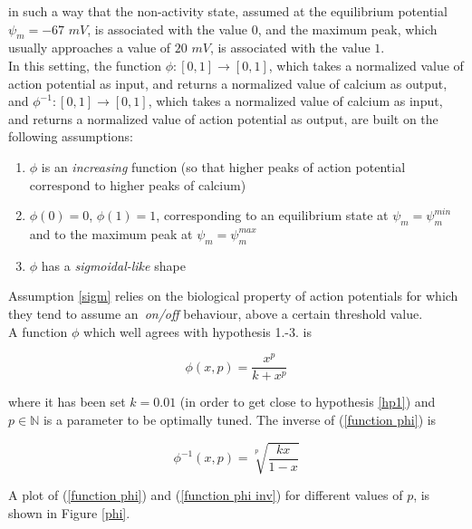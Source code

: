 \documentclass[12pt, a4paper]{report}
\begin{document}
in such a way that the non-activity state, assumed at the equilibrium potential $\psi_m = -67$ $mV$, is associated with the value $0$, and the maximum peak, which  usually approaches a value of $20$ $mV$, is associated with the value $1$.\\
In this setting, the function $ \phi : [0,1] \rightarrow [0,1] $, which takes a normalized value of action potential as input, and returns a normalized value of calcium as output, and $ \phi^{-1} : [0,1] \rightarrow [0,1] $, which takes a normalized value of calcium as input, and returns a normalized value of action potential as output, are built on the following assumptions:

\begin{enumerate}
	\item $\phi$ is  an \textit{increasing} function (so that higher peaks of action potential correspond to higher peaks of calcium) \label{hp1}
	
	\item $\phi (0) = 0 $, $\phi (1) = 1 $, corresponding to an equilibrium state at $\psi_m = \psi_m ^{min}$ and to the maximum peak at  $\psi_m = \psi_m ^{max}$
	
	\item $\phi$ has a \textit{sigmoidal-like} shape \label{sigm}
\end{enumerate}

Assumption \ref{sigm} relies on the biological property of  action potentials for which they tend to assume an\ \textit{on/off} behaviour, above a certain threshold value.\\
A function  $\phi$ which well agrees with hypothesis 1.-3. is

\begin{equation}
	\phi(x,p) = \frac{x^p}{k + x^p}
\end{equation} \label{function phi}

where it has been set $k=0.01$ (in order to get close to hypothesis \ref{hp1}) and $p \in \mathbb{N}$ is a parameter to be optimally tuned. The inverse of (\ref{function phi}) is

\begin{equation}
\phi^{-1}(x,p) = \sqrt[p]{\frac{kx}{1-x}}
\end{equation} \label{function phi inv}

A plot of (\ref{function phi}) and (\ref{function phi inv}) for different values of $p$, is shown in Figure \ref{phi}.
\end{document}
